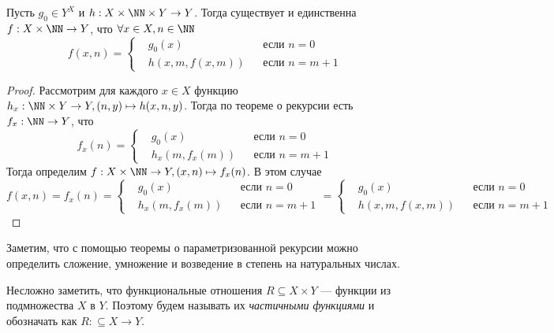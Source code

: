 \documentclass[12pt,a4paper]{article}
\begin{document}
    \begin{theorem}
        Пусть $g_0 \in Y^X$ и $h: X \times \NN \times Y \to Y$. Тогда существует и единственна $f: X \times \NN \to Y$, что $\forall x \in X, n \in \NN$
        \[f(x, n) = \left\{\begin{aligned}
            &g_0(x)&&\text{если }n=0\\
            &h(x, m ,f(x, m))&&\text{если }n=m+1
        \end{aligned}\right.\]
    \end{theorem}

    \begin{proof}
        Рассмотрим для каждого $x \in X$ функцию $h_x: \NN \times Y \to Y, (n, y) \mapsto h(x, n, y)$. Тогда по теореме о рекурсии есть $f_x: \NN \to Y$, что
        \[f_x(n) = \left\{\begin{aligned}
            &g_0(x)&&\text{если $n=0$}\\
            &h_x(m, f_x(m))&&\text{если $n=m+1$}
        \end{aligned}\right.\]
        Тогда определим $f: X \times \NN \to Y, (x, n) \mapsto f_x(n)$. В этом случае
        \[f(x, n) = f_x(n) = \left\{\begin{aligned}
            &g_0(x)&&\text{если $n=0$}\\
            &h_x(m, f_x(m))&&\text{если $n=m+1$}
        \end{aligned}\right.=\left\{\begin{aligned}
            &g_0(x)&&\text{если $n=0$}\\
            &h(x, m, f(x, m))&&\text{если $n=m+1$}
        \end{aligned}\right.\]
    \end{proof}


    \begin{remark}
        Заметим, что с помощью теоремы о параметризованной рекурсии можно определить сложение, умножение и возведение в степень на натуральных числах.
    \end{remark}

    \begin{definition}
        Несложно заметить, что функциональные отношения $R \subseteq X \times Y$ --- функции из подмножества $X$ в $Y$. Поэтому будем называть их \emph{частичными функциями} и обозначать как $R: \subseteq X \to Y$.
    \end{definition}
\end{document}
